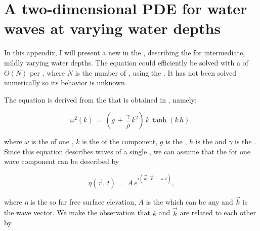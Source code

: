 \chapter{A two-dimensional PDE for water waves at varying water depths}
\label{chap:pde_derivation}

In this appendix, I will present a new   \PDE in the , describing the  for intermediate, mildly varying water depths. The equation could efficiently be solved with a  of $O(N)$ per , where $N$ is the number of , using the \CFMM \citep{White1994}. It has not been solved numerically so its behavior is unknown.

The equation is derived from the  that is obtained in , namely:

\begin{equation} \label{eq:dispersion_again}
\omega^2(k) \,=\, \left(g\,+\,\frac{\gamma}{\rho}\,k^2\right)\,k\,\tanh(k\,h),
\end{equation}

where $\omega$ is the  of one , $k$ is the  of the component, $g$ is the , $h$ is the  and $\gamma$ is the . Since this equation describes waves of a single , we can assume that the  for one wave component can be described by

\begin{equation} \label{eq:component}
\eta(\vec{r},\,t) \,=\, A\,e^{i(\vec{k}\cdot\vec{r}\,-\,\omega\,t)},
\end{equation}

where $\eta$ is the so far  free surface elevation, $A$ is the  which can be any  and $\vec{k}$ is the wave vector. We make the observation that $k$ and $\vec{k}$ are related to each other by


